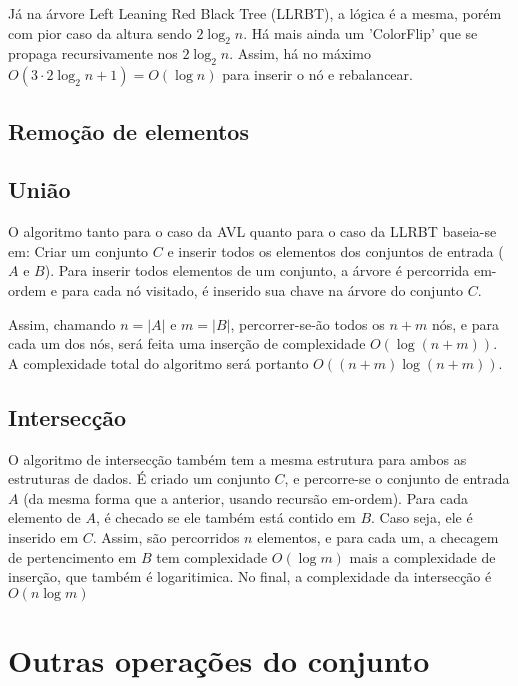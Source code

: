 \documentclass{article}
\begin{document}
Já na árvore Left Leaning Red Black Tree (LLRBT), a lógica é a mesma, porém com pior caso da altura sendo $2\log_2 n$. 
Há mais ainda um 'ColorFlip' que se propaga recursivamente nos $2\log_2 n$. Assim, há no máximo
$O(3 \cdot 2 \log_2 n + 1) = O(\log n)$ para inserir o nó e rebalancear.

\subsection{Remoção de elementos}

\subsection{União}
O algoritmo tanto para o caso da AVL quanto para o caso da LLRBT baseia-se em:
Criar um conjunto $C$ e inserir todos os elementos dos conjuntos de entrada ($A$ e $B$). Para inserir todos elementos de um
conjunto, a árvore é percorrida em-ordem e para cada nó visitado, é inserido sua chave na árvore do conjunto $C$.

Assim, chamando $n = |A|$ e $m = |B|$, percorrer-se-ão todos os $n+m$ nós, e para cada um dos nós, será feita uma inserção
de complexidade $O(\log(n+m))$. A complexidade total do algoritmo será portanto $O((n+m)\log(n+m))$.

\subsection{Intersecção}
O algoritmo de intersecção também tem a mesma estrutura para ambos as estruturas de dados. É criado um conjunto $C$, e percorre-se
o conjunto de entrada $A$ (da mesma forma que a anterior, usando recursão em-ordem). Para cada elemento de $A$, é checado se ele
também está contido em $B$. Caso seja, ele é inserido em $C$.
Assim, são percorridos $n$ elementos, e para cada um, a checagem de pertencimento em $B$ tem complexidade $O(\log m)$ mais a 
complexidade de inserção, que também é logaritimica. No final, a complexidade da intersecção é $O(n\log m)$  

\section{Outras operações do conjunto}
\end{document}
